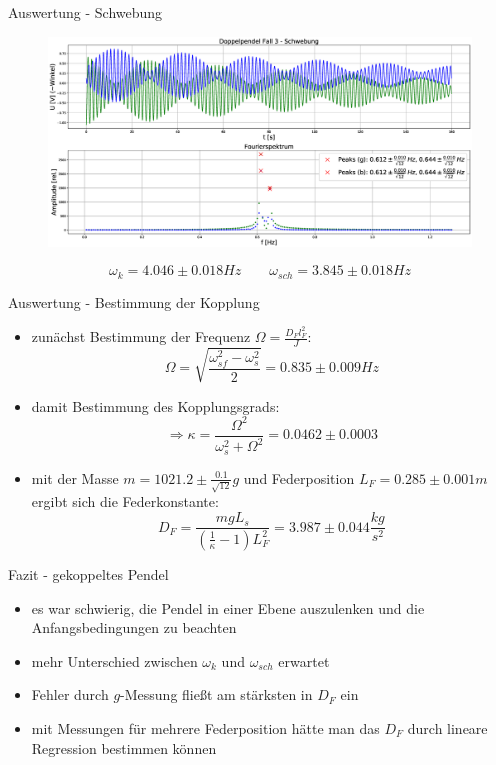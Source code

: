 \documentclass[12pt]{beamer}
\begin{document}
\begin{frame}{Auswertung - Schwebung}
\begin{figure}[t]
	\centering
	\includegraphics[width=1\textwidth,height=0.7\textheight]{Doppelpendel3.eps}
\end{figure}
\begin{equation*}
\omega_k = 4.046 \pm 0.018 Hz \qquad \omega_{sch} = 3.845 \pm 0.018 Hz
\end{equation*}
\end{frame}

\begin{frame}{Auswertung - Bestimmung der Kopplung}
\begin{itemize}
	\item zunächst Bestimmung der Frequenz $\Omega = \frac{D_Fl_F^2}{J}$:
		\begin{equation*}
		\Omega = \sqrt{\frac{\omega_{sf}^2-\omega_s^2}{2}} = 0.835 \pm 0.009 Hz
		\end{equation*}
	\item damit Bestimmung des Kopplungsgrads:
		\begin{equation*}
			\Rightarrow \kappa = \frac{\Omega^2}{\omega_s^2 + \Omega^2} = 0.0462 \pm 0.0003
		\end{equation*}
	\item mit der Masse $m = 1021.2 \pm \frac{0.1}{\sqrt{12}} g$ und Federposition $L_F = 0.285 \pm 0.001 m$ ergibt sich die Federkonstante:
		\begin{equation*}
			D_F = \frac{mgL_s}{\left(\frac{1}{\kappa}-1\right) L_F^2 } = 3.987 \pm 0.044 \frac{kg}{s^2}
		\end{equation*}
\end{itemize}

\end{frame}

\begin{frame}{Fazit - gekoppeltes Pendel}
\begin{itemize}
\item es war schwierig, die Pendel in einer Ebene auszulenken und die Anfangsbedingungen zu beachten
\item mehr Unterschied zwischen $\omega_k$ und $\omega_{sch}$ erwartet
\item Fehler durch $g$-Messung fließt am stärksten in $D_F$ ein
\item mit Messungen für mehrere Federposition hätte man das $D_F$ durch lineare Regression bestimmen können
\end{itemize}
\end{frame}
\end{document}
